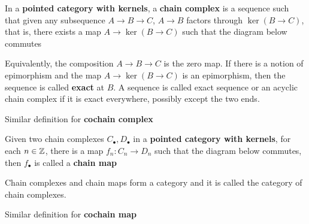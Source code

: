 \begin{definition}
	In a \textbf{pointed category with kernels}, a \textbf{chain complex} is a sequence such that given any subsequence $A \to B \to C$, $A \to B$ factors through $\ker (B \to C)$, that is, there exists a map $A \to \ker (B \to C)$ such that the diagram below commutes
	\begin{center}
	\end{center}
	
	Equivalently, the composition $A \to B \to C$ is the zero map. If there is a notion of epimorphism and the map $A \to \ker (B \to C)$ is an epimorphism, then the sequence is called \textbf{exact} at $B$. A sequence is called exact sequence or an acyclic chain complex if it is exact everywhere, possibly except the two ends.
	
	Similar definition for \textbf{cochain complex}
\end{definition}

\begin{definition}
	Given two chain complexes $C_\bullet, D_\bullet$ in a \textbf{pointed category with kernels}, for each $n \in \mathbb{Z}$, there is a map $f_n: C_n \to D_n$ such that the diagram below commutes, then $f_\bullet$ is called a \textbf{chain map}
	\begin{center}
	\end{center}
	
	Chain complexes and chain maps form a category and it is called the category of chain complexes.

	Similar definition for \textbf{cochain map}
\end{definition}

